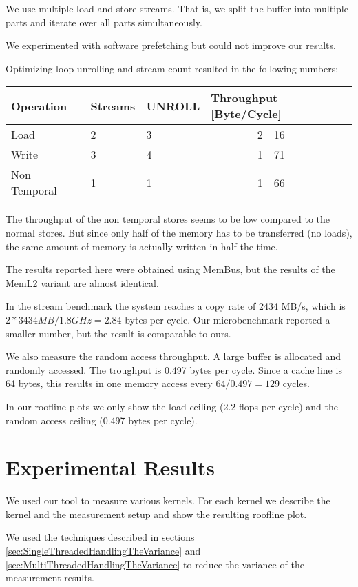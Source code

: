 \documentclass[a4paper,12pt]{article}
\begin{document}
We use multiple load and store streams. That is, we split the buffer
into multiple parts and iterate over all parts simultaneously.

We experimented with software prefetching but could not improve our results. 

Optimizing loop unrolling and stream count resulted in  the following
numbers:

\begin{center}
\begin{tabular}{lllr@{.}l}
\toprule
Operation & Streams & UNROLL &  \multicolumn{2}{l}{Throughput
[Byte/Cycle]} \\
\midrule
Load  &  2 & 3 & 2&16\\
Write &  3 & 4 & 1&71\\
Non Temporal & 1 & 1 & 1&66\\
\bottomrule
\end{tabular}
\end{center}

The throughput of the non temporal stores seems to be low compared to the
normal stores. But since only half of the memory has to be transferred (no
loads), the same amount of memory is actually written in half the time.

The results reported here were obtained using MemBus, but the results of the
MemL2 variant are almost identical.
 
In the stream benchmark \cite{stream} the system reaches a copy rate of 2434
MB/s, which is $2*3434MB/1.8GHz=2.84$ bytes per cycle. Our microbenchmark
reported a smaller number, but the result is comparable to ours.

We also measure the random access throughput. A large buffer is allocated and
randomly accessed. The troughput is 0.497 bytes per cycle. Since a cache line is
64 bytes, this results in one memory access every $64/0.497=129$ cycles.

In our roofline plots we only show the load ceiling (2.2 flops per cycle) and
the random access ceiling (0.497 bytes per cycle).

\section{Experimental Results}
We used our tool to measure various kernels. For each kernel we describe the
kernel and the measurement setup and show the resulting roofline plot.

We used the techniques described in sections
\ref{sec:SingleThreadedHandlingTheVariance} and
\ref{sec:MultiThreadedHandlingTheVariance} to reduce the variance of the
measurement results. 
\end{document}
